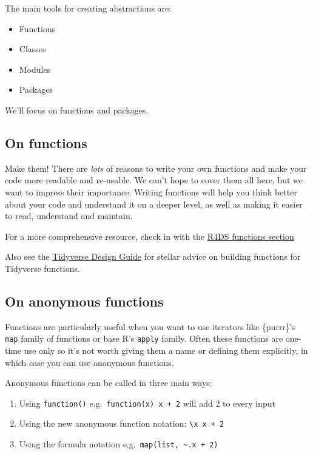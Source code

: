 \documentclass[
  letterpaper,
  DIV=11,
  numbers=noendperiod]{scrreprt}
\providecommand{\tightlist}{%
  \setlength{\itemsep}{0pt}\setlength{\parskip}{0pt}}\usepackage{longtable,booktabs,array}
\begin{document}
The main tools for creating abstractions are:

\begin{itemize}
\tightlist
\item
  Functions
\item
  Classes
\item
  Modules
\item
  Packages
\end{itemize}

We'll focus on functions and packages.

\subsection{On functions}\label{on-functions}

Make them! There are \emph{lots} of reasons to write your own functions
and make your code more readable and re-usable. We can't hope to cover
them all here, but we want to impress their importance. Writing
functions will help you think better about your code and understand it
on a deeper level, as well as making it easier to read, understand and
maintain.

For a more comprehensive resource, check in with the
\href{https://r4ds.had.co.nz/functions.html?q=functions\#functions}{R4DS
functions section}

Also see the \href{https://design.tidyverse.org/unifying.html}{Tidyverse
Design Guide} for stellar advice on building functions for Tidyverse
functions.

\subsection{On anonymous functions}\label{on-anonymous-functions}

Functions are particularly useful when you want to use iterators like
\{purrr\}'s \texttt{map} family of functions or base R's \texttt{apply}
family. Often these functions are one-time use only so it's not worth
giving them a name or defining them explicitly, in which case you can
use anonymous functions.

Anonymous functions can be called in three main ways:

\begin{enumerate}
\def\labelenumi{\arabic{enumi}.}
\tightlist
\item
  Using \texttt{function()} e.g.~\texttt{function(x)\ x\ +\ 2} will add
  2 to every input
\item
  Using the new anonymous function notation:
  \texttt{\textbackslash{}x\ x\ +\ 2}
\item
  Using the formula notation
  e.g.~\texttt{map(list,\ \textasciitilde{}.x\ +\ 2)}
\end{enumerate}
\end{document}

